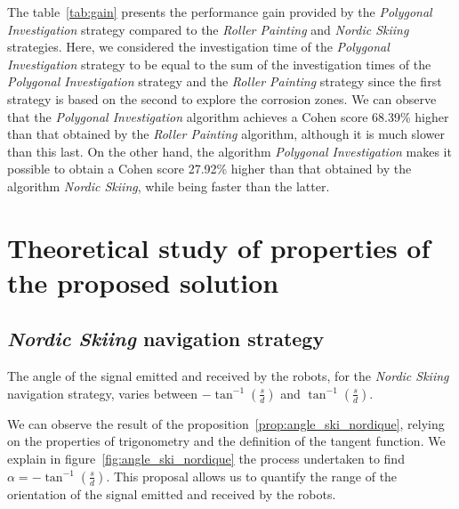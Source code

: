 The table~\ref{tab:gain} presents the performance gain provided by the \textit{Polygonal Investigation} strategy compared to the \textit{Roller Painting} and \textit{Nordic Skiing} strategies.
Here, we considered the investigation time of the \textit{Polygonal Investigation} strategy to be equal to the sum of the investigation times of the \textit{Polygonal Investigation} strategy and the \textit{Roller Painting} strategy since the first strategy is based on the second to explore the corrosion zones.
We can observe that the \textit{Polygonal Investigation} algorithm achieves a Cohen score 68.39\% higher than that obtained by the \textit{Roller Painting} algorithm, although it is much slower than this last.
On the other hand, the algorithm \textit{Polygonal Investigation} makes it possible to obtain a Cohen score 27.92\% higher than that obtained by the algorithm \textit{Nordic Skiing}, while being faster than the latter.

\section*{Theoretical study of properties of the proposed solution}

\subsection*{\textit{Nordic Skiing} navigation strategy}

\begin{proposition}
	The angle of the signal emitted and received by the robots, for the \textit{Nordic Skiing} navigation strategy, varies between $-\tan^{-1}(\frac{s}{d})$ and $\tan ^{-1}(\frac{s}{d})$.
	\label{prop:angle_ski_nordique}
\end{proposition}

We can observe the result of the proposition~\ref{prop:angle_ski_nordique}, relying on the properties of trigonometry and the definition of the tangent function.
We explain in figure~\ref{fig:angle_ski_nordique} the process undertaken to find $\alpha = -\tan^{-1}(\frac{s}{d})$.
This proposal allows us to quantify the range of the orientation of the signal emitted and received by the robots.

